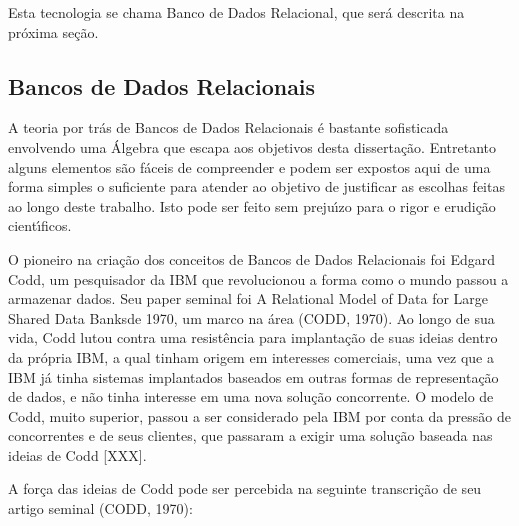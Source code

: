 \documentclass[
12pt,		%
openright,	%
twoside,  %
a4paper,			%
chapter=TITLE,		%
english,			%
french,				%
spanish,			%
brazil				%
]{USPSC-classe/USPSC_RedarTex}
\begin{document}
Esta tecnologia se chama \textquotedbl Banco de Dados Relacional\textquotedbl , que ser\'a descrita na pr\'oxima se\c{c}\~ao.










\subsection[Bancos de Dados Relacionais]{Bancos de Dados Relacionais}\label{Bancos de Dados Relacionais}
A teoria por tr\'as de Bancos de Dados Relacionais \'e bastante sofisticada envolvendo uma \'Algebra que escapa aos objetivos desta disserta\c{c}\~ao. Entretanto alguns elementos s\~ao f\'aceis de compreender e podem ser expostos aqui de uma forma simples o suficiente para atender ao objetivo de justificar as escolhas feitas ao longo deste trabalho. Isto pode ser feito sem preju\'{\i}zo para o rigor e erudi\c{c}\~ao cient\'{\i}ficos.










O pioneiro na cria\c{c}\~ao dos conceitos de Bancos de Dados Relacionais foi Edgard Codd, um pesquisador da IBM que revolucionou a forma como o mundo passou a armazenar dados. Seu paper seminal foi  \textquotedbl A Relational Model of Data for Large Shared Data Banks\textquotedbl  de 1970, um marco na \'area (CODD, 1970). Ao longo de sua vida, Codd lutou contra uma resist\^encia para implanta\c{c}\~ao de suas ideias dentro da pr\'opria IBM, a qual tinham origem em interesses comerciais, uma vez que a IBM j\'a tinha sistemas implantados baseados em outras formas de representa\c{c}\~ao de dados, e n\~ao tinha interesse em uma nova solu\c{c}\~ao concorrente. O modelo de Codd, muito superior, passou a ser considerado pela IBM por conta da press\~ao de concorrentes e de seus clientes, que passaram a exigir uma solu\c{c}\~ao baseada nas ideias de Codd [XXX].










A for\c{c}a das ideias de Codd pode ser percebida na seguinte transcri\c{c}\~ao de seu artigo seminal (CODD, 1970):
\end{document}
